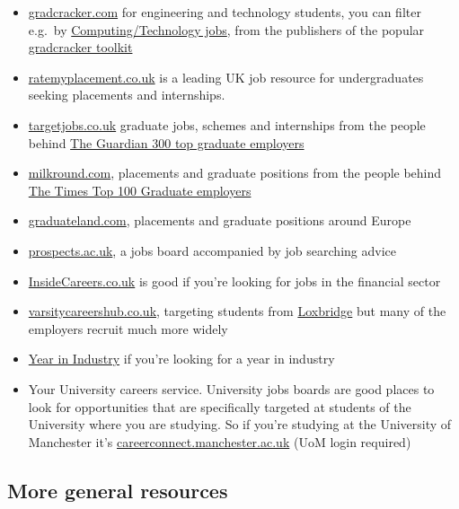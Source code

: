 \documentclass[
]{book}
\providecommand{\tightlist}{%
  \setlength{\itemsep}{0pt}\setlength{\parskip}{0pt}}
\begin{document}
\begin{itemize}
\tightlist
\item
  \href{http://www.gradcracker.com/}{gradcracker.com} for engineering and technology students, you can filter e.g.~by \href{https://www.gradcracker.com/search/computing-technology/jobs}{Computing/Technology jobs}, from the publishers of the popular \href{http://www.gradcracker.com/career-centre/toolkit}{gradcracker toolkit}
\item
  \href{http://www.ratemyplacement.co.uk/}{ratemyplacement.co.uk} is a leading UK job resource for undergraduates seeking placements and internships.
\item
  \href{http://www.targetjobs.co.uk/}{targetjobs.co.uk} graduate jobs, schemes and internships from the people behind \href{https://targetjobs.co.uk/uk300}{The Guardian 300 top graduate employers}
\item
  \href{http://www.milkround.com/}{milkround.com}, placements and graduate positions from the people behind \href{https://digital.top100graduateemployers.com/view/153459/}{The Times Top 100 Graduate employers}
\item
  \href{https://graduateland.com/}{graduateland.com}, placements and graduate positions around Europe
\item
  \href{https://www.prospects.ac.uk/}{prospects.ac.uk}, a jobs board accompanied by job searching advice
\item
  \href{https://www.insidecareers.co.uk}{InsideCareers.co.uk} is good if you're looking for jobs in the financial sector
\item
  \href{https://www.varsitycareershub.co.uk/}{varsitycareershub.co.uk}, targeting students from \href{https://en.wikipedia.org/wiki/Loxbridge}{Loxbridge} but many of the employers recruit much more widely
\item
  \href{https://www.etrust.org.uk/yini-vacancies}{Year in Industry} if you're looking for a year in industry
\item
  Your University careers service. University jobs boards are good places to look for opportunities that are specifically targeted at students of the University where you are studying. So if you're studying at the University of Manchester it's \href{https://careerconnect.manchester.ac.uk/user/jobs.html}{careerconnect.manchester.ac.uk} (UoM login required)
\end{itemize}

\hypertarget{generaljobs}{%
\subsection{More general resources}\label{generaljobs}}
\end{document}
